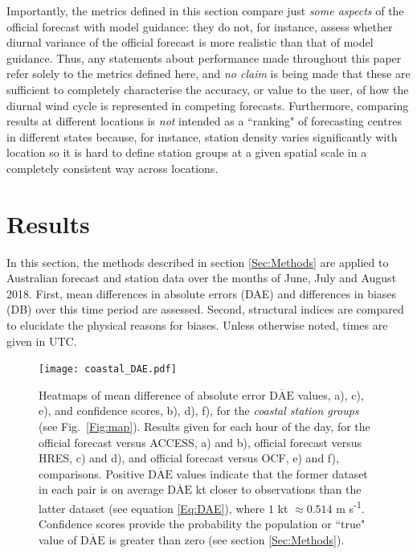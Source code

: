 \documentclass{ametsoc}
\begin{document}
Importantly, the metrics defined in this section compare just \textit{some aspects} of the official forecast with model guidance: they do not, for instance, assess whether diurnal variance of the official forecast is more realistic than that of model guidance. Thus, any statements about performance made throughout this paper refer solely to the metrics defined here, and \textit{no claim} is being made that these are sufficient to completely characterise the accuracy, or value to the user, of how the diurnal wind cycle is represented in competing forecasts. Furthermore, comparing results at different locations is \textit{not} intended as a ``ranking" of forecasting centres in different states because, for instance, station density varies significantly with location so it is hard to define station groups at a given spatial scale in a completely consistent way across locations.

\section{Results}
\label{Sec:Results}
In this section, the methods described in section \ref{Sec:Methods} are applied to Australian forecast and station data over the months of June, July and August 2018. First, mean differences in absolute errors (DAE) and differences in biases (DB) over this time period are assessed. Second, structural indices are compared to elucidate the physical reasons for biases. Unless otherwise noted, times are given in UTC.

\begin{figure}
\centering
\texttt{[image: coastal\_DAE.pdf]}
\caption{Heatmaps of mean difference of absolute error $\overline{\text{DAE}}$ values, a), c), e), and confidence scores, b), d), f), for the \textit{coastal station groups} (see Fig.~\ref{Fig:map}). Results given for each hour of the day, for the official forecast versus ACCESS, a) and b), official forecast versus HRES, c) and d), and official forecast versus OCF, e) and f), comparisons. Positive $\overline{\text{DAE}}$ values indicate that the former dataset in each pair is on average $\overline{\text{DAE}}$ kt closer to observations than the latter dataset (see equation \ref{Eq:DAE}), where $1$ kt $\approx 0.514$ m s\textsuperscript{-1}. Confidence scores provide the probability the population or ``true" value of $\overline{\text{DAE}}$ is greater than zero (see section \ref{Sec:Methods}).}
\label{Fig:coastal_DAE}
\end{figure}
\end{document}
